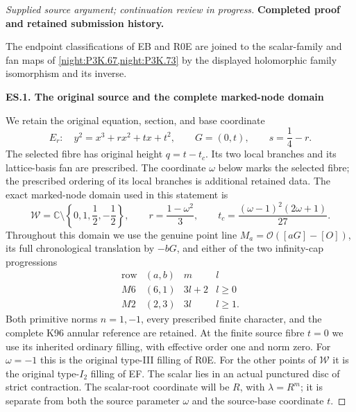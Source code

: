 \begin{proof}[Supplied source argument; continuation review in progress]

\par

\medskip\noindent\textbf{Completed proof and retained submission history.}

\par



The endpoint classifications of EB and R0E are joined to the
scalar-family and fan maps of \cref{night:P3K.67,night:P3K.73}
by the displayed holomorphic family isomorphism and its inverse.

\par

\medskip\noindent\textbf{ES.1. The original source and the complete marked-node domain}

\par\nobreak

We retain the original equation, section, and base coordinate
\[
 E_r:\quad y^2=x^3+rx^2+tx+t^2,\qquad G=(0,t),\qquad
 s=\frac14-r .
 \tag{ES.1}
\]
The selected fibre has original height \(q=t-t_c\). Its two local
branches and its lattice-basis fan are prescribed. The coordinate
\(\omega\) below marks the selected fibre; the prescribed ordering
of its local branches is additional retained data. The exact
marked-node domain used in this statement is
\[
 \mathcal W=\mathbb C\setminus
 \left\{0,1,\frac12,-\frac12\right\},\qquad
 r=\frac{1-\omega^2}{3},\qquad
 t_c=\frac{(\omega-1)^2(2\omega+1)}{27}.
 \tag{ES.2}
\]
Throughout this domain we use the genuine point line
\(M_a=\mathcal O([aG]-[O])\), its full chronological translation
by \(-bG\), and either of the two infinity-cap progressions
\[
 \begin{array}{c|c|c|c}
 \text{row}&(a,b)&m&l\\ \hline
 M6&(6,1)&3l+2&l\geq0\\
 M2&(2,3)&3l&l\geq1 .
 \end{array}
 \tag{ES.3}
\]
Both primitive norms \(n=1,-1\), every prescribed finite character,
and the complete K96 annular reference are retained. At the finite
source fibre \(t=0\) we use its inherited ordinary filling, with
effective order one and norm zero. For \(\omega=-1\) this is the
original type-III filling of R0E. For the other points of
\(\mathcal W\) it is the original type-\(I_2\) filling of EF.
The scalar lies in an actual punctured disc of strict contraction.
The scalar-root coordinate will be \(R\), with \(\lambda=R^m\);
it is separate from both the source parameter \(\omega\) and the
source-base coordinate \(t\).


\end{proof}
